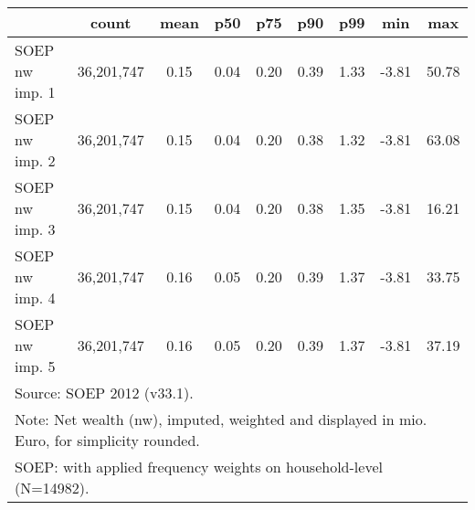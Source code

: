 {
\def\sym#1{\ifmmode^{#1}\else\(^{#1}\)\fi}
\begin{tabular}{l*{1}{cccccccc}}
\hline\hline
                                            &       count&        mean&         p50&         p75&         p90&         p99&         min&         max\\
\hline
SOEP nw imp. 1                              &  36,201,747&        0.15&        0.04&        0.20&        0.39&        1.33&       -3.81&       50.78\\
SOEP nw imp. 2                              &  36,201,747&        0.15&        0.04&        0.20&        0.38&        1.32&       -3.81&       63.08\\
SOEP nw imp. 3                              &  36,201,747&        0.15&        0.04&        0.20&        0.38&        1.35&       -3.81&       16.21\\
SOEP nw imp. 4                              &  36,201,747&        0.16&        0.05&        0.20&        0.39&        1.37&       -3.81&       33.75\\
SOEP nw imp. 5                              &  36,201,747&        0.16&        0.05&        0.20&        0.39&        1.37&       -3.81&       37.19\\
\hline\hline
\multicolumn{9}{l}{\footnotesize Source: SOEP 2012 (v33.1).}\\
\multicolumn{9}{l}{\footnotesize Note: Net wealth (nw), imputed, weighted and displayed in mio. Euro, for simplicity rounded.}\\
\multicolumn{9}{l}{\footnotesize SOEP: with applied frequency weights on household-level (N=14982).}\\
\end{tabular}
}
